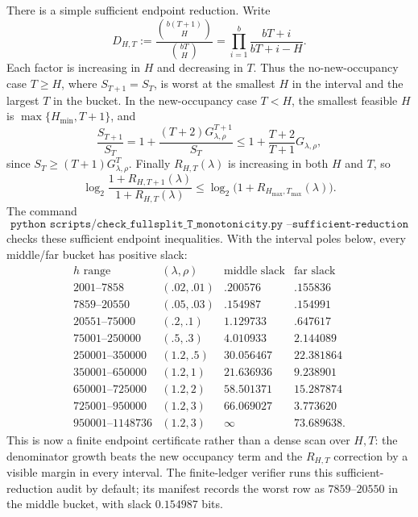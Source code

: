 There is a simple sufficient endpoint reduction.  Write
\[
D_{H,T}:=\frac{\binom{b(T+1)}{H}}{\binom{bT}{H}}
=\prod_{i=1}^{b}\frac{bT+i}{bT+i-H}.
\]
Each factor is increasing in \(H\) and decreasing in \(T\).  Thus the no-new-occupancy case \(T\ge H\), where
\(S_{T+1}=S_T\), is worst at the smallest \(H\) in the interval and the largest \(T\) in the bucket.  In the
new-occupancy case \(T<H\), the smallest feasible \(H\) is \(\max\{H_{\min},T+1\}\), and
\[
\frac{S_{T+1}}{S_T}
=
1+\frac{(T+2)G_{\lambda,\rho}^{T+1}}{S_T}
\le
1+\frac{T+2}{T+1}G_{\lambda,\rho},
\]
since \(S_T\ge (T+1)G_{\lambda,\rho}^T\).  Finally \(R_{H,T}(\lambda)\) is increasing in both \(H\) and \(T\), so
\[
\log_2\frac{1+R_{H,T+1}(\lambda)}{1+R_{H,T}(\lambda)}
\le
\log_2\bigl(1+R_{H_{\max},T_{\max}}(\lambda)\bigr).
\]
The command
\[
\texttt{python scripts/check\_fullsplit\_T\_monotonicity.py --sufficient-reduction}
\]
checks these sufficient endpoint inequalities.  With the interval poles below, every middle/far bucket has positive
slack:
\[
\begin{array}{c|c|c|c}
h\text{ range} & (\lambda,\rho) & \text{middle slack} & \text{far slack}\\
\hline
2001\text{--}7858 & (.02,.01) & .200576 & .155836\\
7859\text{--}20550 & (.05,.03) & .154987 & .154991\\
20551\text{--}75000 & (.2,.1) & 1.129733 & .647617\\
75001\text{--}250000 & (.5,.3) & 4.010933 & 2.144089\\
250001\text{--}350000 & (1.2,.5) & 30.056467 & 22.381864\\
350001\text{--}650000 & (1.2,1) & 21.636936 & 9.238901\\
650001\text{--}725000 & (1.2,2) & 58.501371 & 15.287874\\
725001\text{--}950000 & (1.2,3) & 66.069027 & 3.773620\\
950001\text{--}1148736 & (1.2,3) & \infty & 73.689638 .
\end{array}
\]
This is now a finite endpoint certificate rather than a dense scan over \(H,T\): the denominator growth beats the
new occupancy term and the \(R_{H,T}\) correction by a visible margin in every interval.
The finite-ledger verifier runs this sufficient-reduction audit by default; its manifest records the worst row as
\(7859\text{--}20550\) in the middle bucket, with slack \(0.154987\) bits.

